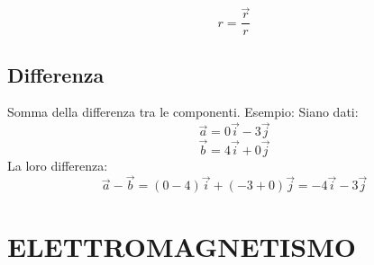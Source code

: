 \documentclass{article}
\begin{document}
\begin{equation*}
  r=\frac{\overrightarrow{r}}{r}
\end{equation*}


\subsection{Differenza}

Somma della differenza tra le componenti. Esempio:
Siano dati:
\begin{equation*}
  \overrightarrow{a} = 0\overrightarrow{i}-3\overrightarrow{j}
\end{equation*}
\begin{equation*}
  \overrightarrow{b} = 4\overrightarrow{i}+0\overrightarrow{j}
\end{equation*}
La loro differenza:
\begin{equation*}
  \overrightarrow{a}-\overrightarrow{b} = (0-4)\overrightarrow{i}+(-3+0)\overrightarrow{j} = -4\overrightarrow{i}-3\overrightarrow{j}
\end{equation*}

\section{ELETTROMAGNETISMO}
\end{document}
